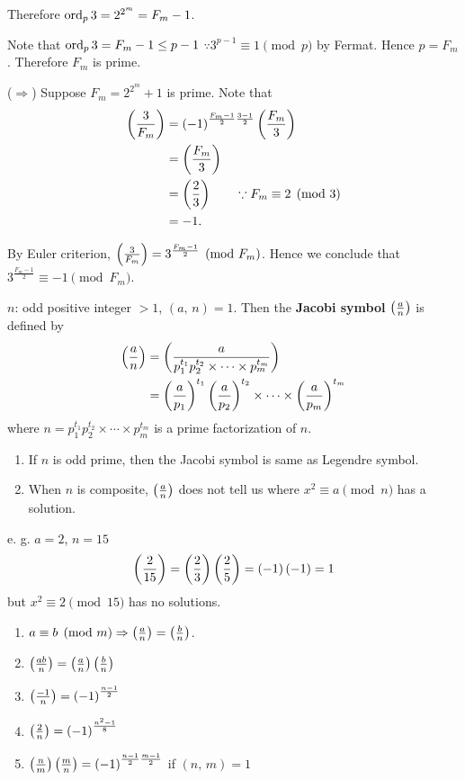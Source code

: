 Therefore $\operatorname{\mathrm{ord}}_p 3 = 2^{2^m} = F_m-1$.

Note that $\operatorname{\mathrm{ord}}_p 3 = F_m - 1 \leq p-1$ $\because 3^{p-1} \equiv 1 \pmod{p}$ by Fermat.
Hence $p=F_m$. Therefore $F_m$ is prime.

($\Rightarrow$) Suppose $F_m=2^{2^m}+1$ is prime. Note that
\begin{align*}
    \left(\frac{3}{F_m}\right)&=\left(-1\right)^{\frac{F_m-1}{2}\frac{3-1}{2}}\left(\frac{F_m}{3}\right) \\
    &= \left(\frac{F_m}{3}\right) \\
    &= \left(\frac{2}{3}\right) \qquad \because F_m \equiv 2 \pmod{3} \\
    &= -1.
\end{align*}

By Euler criterion, $\left(\frac{3}{F_m}\right)=3^{\frac{F_m-1}{2}} \pmod{F_m}$.
Hence we conclude that $3^{\frac{F_m-1}{2}} \equiv -1 \pmod{F_m}$.

\begin{definition}
    $n$: odd positive integer $>1$, $\left(a,\,n\right)=1$. Then the
    \textbf{Jacobi symbol} $\left(\frac{a}{n}\right)$ is defined by
    \begin{align*}
        \left(\frac{a}{n}\right) &= \left(\frac{a}{p_1^{t_1} p_2^{t_2} \times\cdots\times p_m^{t_m}}\right) \\
        &= \left(\frac{a}{p_1}\right)^{t_1}\left(\frac{a}{p_2}\right)^{t_2}\times\cdots\times \left(\frac{a}{p_m}\right)^{t_m}
    \end{align*}
    where $n = p_1^{t_1} p_2^{t_2} \times\cdots\times p_m^{t_m}$ is a prime factorization of $n$.
\end{definition}

\begin{remark}
    \begin{enumerate}
        \item If $n$ is odd prime, then the Jacobi symbol is same as Legendre symbol.
        \item When $n$ is composite, $\left(\frac{a}{n}\right)$ does not tell us where $x^2 \equiv a \pmod{n}$
        has a solution.
    \end{enumerate}
\end{remark}

e. g. $a=2$, $n=15$
\[
    \left(\frac{2}{15}\right) = \left(\frac{2}{3}\right) \left(\frac{2}{5}\right) = \left(-1\right)\left(-1\right) = 1
\]
but $x^2 \equiv 2 \pmod{15}$ has no solutions.

\begin{theorem}
    \begin{enumerate}
        \item $a \equiv b \pmod{m} \Rightarrow \left(\frac{a}{n}\right) = \left(\frac{b}{n}\right)$.
        \item $\left(\frac{ab}{n}\right)=\left(\frac{a}{n}\right)\left(\frac{b}{n}\right)$
        \item $\left(\frac{-1}{n}\right)=\left(-1\right)^{\frac{n-1}{2}}$
        \item $\left(\frac{2}{n}\right)=\left(-1\right)^{\frac{n^2-1}{8}}$
        \item $\left(\frac{n}{m}\right)\left(\frac{m}{n}\right)=\left(-1\right)^{\frac{n-1}{2}\frac{m-1}{2}}$ if $\left(n,\,m\right)=1$
    \end{enumerate}
\end{theorem}

